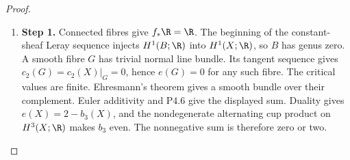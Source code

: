 \begin{proof}
\begin{enumerate}[label={$\langle1\rangle$\arabic*.},leftmargin=*]
\item 
\noindent\textbf{Step 1.} Connected fibres give $f_*\R=\R$. The beginning of the constant-sheaf
Leray sequence injects $H^1(B;\R)$ into $H^1(X;\R)$, so $B$ has genus
zero. A smooth fibre $G$ has trivial normal line bundle. Its tangent
sequence gives $c_2(G)=c_2(X)|_G=0$, hence $e(G)=0$ for any such fibre.
The critical values are finite. Ehresmann's theorem gives a smooth
bundle over their complement. Euler additivity and P4.6 give the
displayed sum. Duality gives $e(X)=2-b_3(X)$, and the nondegenerate
alternating cup product on $H^3(X;\R)$ makes $b_3$ even. The
nonnegative sum is therefore zero or two.

\end{enumerate}
\end{proof}
